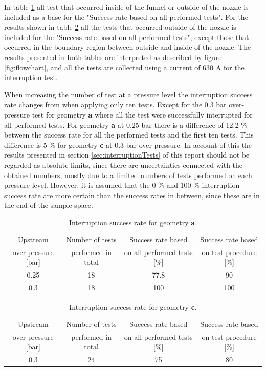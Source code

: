 \documentclass[10pt,b5paper,twoside]{article}
\begin{document}
In table \ref{tab:successrate1} all test that occurred inside of the funnel or outside of the nozzle is included as a base for the "Success rate based on all performed tests". For the results shown in table \ref{tab:successrate2} all the tests that occurred outside of the nozzle is included for the "Success rate based on all performed tests", except those that occurred in the boundary region between outside and inside of the nozzle. The results presented in both tables are interpreted as described by figure \ref{fig:flowchart}, and all the tests are collected using a current of 630 A for the interruption test. 

When increasing the number of test at a pressure level the interruption success rate changes from when applying only ten tests. Except for the 0.3 bar over-pressure test for geometry \textbf{a} where all the test were successfully interrupted for all performed tests. For geometry \textbf{a} at 0.25 bar there is a difference of 12.2 \% between the success rate for all the performed tests and the first ten tests. This difference is 5 \% for geometry \textbf{c} at 0.3 bar over-pressure. In account of this the results presented in section \ref{sec:interruptionTests} of this report should not be regarded as absolute limits, since there are uncertainties connected with the obtained numbers, mostly due to a limited numbers of tests performed on each pressure level. However, it is assumed that the 0 \% and 100 \% interruption success rate are more certain than the success rates in between, since these are in the end of the sample space.

\begin{table}[H]
\center
\caption{Interruption success rate for geometry \textbf{a}.}
\begin{tabular}{|c|c|c|c|}
\hline 
Upstream & Number of tests & Success rate based & Success rate based \\ over-pressure [bar] &  performed in total &  on all performed tests [\%] &  on test procedure [\%] \\ 
\hline 
0.25 & 18 & 77.8 & 90 \\ 
\hline 
0.3 & 18 & 100 & 100 \\ 
\hline 
\end{tabular} 
\label{tab:successrate1}
\end{table}

\begin{table}[H]
\center
\caption{Interruption success rate for geometry \textbf{c}.}
\begin{tabular}{|c|c|c|c|}
\hline 
Upstream & Number of tests & Success rate based & Success rate based \\ over-pressure [bar] &  performed in total &  on all performed tests [\%] &  on test procedure [\%] \\ 
\hline 
0.3 & 24 & 75 & 80 \\ 
\hline  
\end{tabular} 
\label{tab:successrate2}
\end{table}
\end{document}
